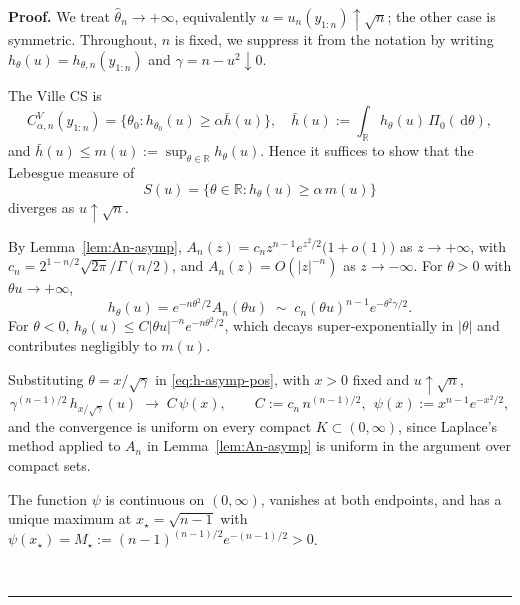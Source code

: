 \documentclass{article}%
\newenvironment{proof}[1][Proof]{\noindent\textbf{#1.} }{\ \rule{0.5em}{0.5em}}
\newcommand{\dd}{\,\mathrm{d}}
\newcommand{\1}{\mathbf{1}}
\begin{document}
\begin{proof}
    We treat $\widehat\theta_n \to +\infty$, equivalently $u = u_n(y_{1:n})
\uparrow \sqrt n$; the other case is symmetric. Throughout, $n$ is fixed, we suppress it from the notation by writing $h_\theta(u) = h_{\theta,n}(y_{1:n})$ and $\gamma = n - u^2 \downarrow 0$.

The Ville CS is
\[
  C_{\alpha,n}^V(y_{1:n}) = \bigl\{\theta_0 : h_{\theta_0}(u) \geq \alpha
  \bar h(u)\bigr\}, \quad \bar h(u) := \int_\mathbb{R} h_\theta(u)\,\Pi_0(\dd\theta),
\]
and $\bar h(u) \leq m(u) := \sup_{\theta\in\mathbb{R}}h_\theta(u)$. Hence it
suffices to show that the Lebesgue measure of
\[
  S(u) = \{\theta\in\mathbb{R} : h_\theta(u) \geq \alpha\,m(u)\}
\]
diverges as $u\uparrow\sqrt n$.

By Lemma~\ref{lem:An-asymp}, $A_n(z) = c_n z^{n-1}e^{z^2/2}\bigl(1+o(1)\bigr)$
as $z\to+\infty$, with $c_n = 2^{1-n/2}\sqrt{2\pi}/\Gamma(n/2)$, and
$A_n(z) = O(|z|^{-n})$ as $z\to-\infty$. For $\theta > 0$ with
$\theta u \to +\infty$,
\begin{equation}\label{eq:h-asymp-pos}
  h_\theta(u) = e^{-n\theta^2/2}A_n(\theta u)
  \;\sim\; c_n(\theta u)^{n-1}e^{-\theta^2\gamma/2}.
\end{equation}
For $\theta < 0$, $h_\theta(u) \leq C|\theta u|^{-n}e^{-n\theta^2/2}$,
which decays super-exponentially in $|\theta|$ and contributes
negligibly to $m(u)$.

Substituting $\theta = x/\sqrt\gamma$ in \eqref{eq:h-asymp-pos}, with
$x > 0$ fixed and $u\uparrow\sqrt n$,
\begin{equation}\label{eq:rescaled-limit}
  \gamma^{(n-1)/2}\,h_{x/\sqrt\gamma}(u)
  \;\longrightarrow\; C\,\psi(x),
  \qquad C := c_n\,n^{(n-1)/2},\ \ \psi(x) := x^{n-1}e^{-x^2/2},
\end{equation}
and the convergence is uniform on every compact $K \subset (0,\infty)$,
since Laplace's method applied to $A_n$ in Lemma~\ref{lem:An-asymp} is
uniform in the argument over compact sets.

The function $\psi$ is continuous on $(0,\infty)$, vanishes at both
endpoints, and has a unique maximum at $x_\star = \sqrt{n-1}$ with
$\psi(x_\star) = M_\star := (n-1)^{(n-1)/2}e^{-(n-1)/2} > 0$.


\end{proof}
\end{document}
